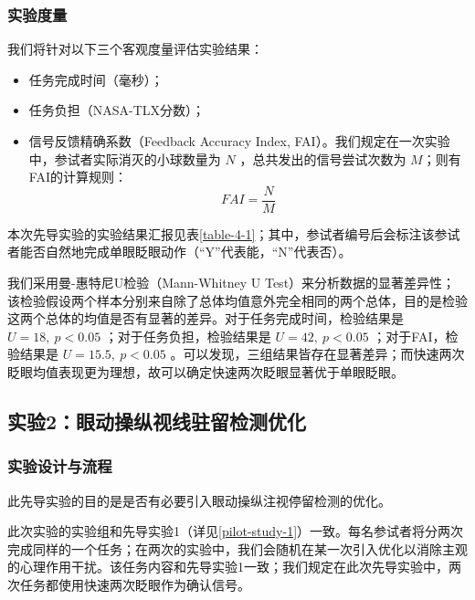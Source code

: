 \subsubsection{实验度量}

我们将针对以下三个客观度量评估实验结果：

\begin{itemize}[wide]
	\item 任务完成时间（毫秒）；
	\item 任务负担（NASA-TLX分数）；
	\item 信号反馈精确系数（Feedback Accuracy Index, FAI）。我们规定在一次实验中，参试者实际消灭的小球数量为 $N$ ，总共发出的信号尝试次数为 $M$；则有FAI的计算规则：
	\begin{equation}
	FAI = \frac{N}{M}
	\label{formula-4-1}
	\end{equation}
\end{itemize}

本次先导实验的实验结果汇报见表\ref{table-4-1}；其中，参试者编号后会标注该参试者能否自然地完成单眼眨眼动作（“Y”代表能，“N”代表否）。

我们采用曼-惠特尼U检验（Mann-Whitney U Test）来分析数据的显著差异性；该检验假设两个样本分别来自除了总体均值意外完全相同的两个总体，目的是检验这两个总体的均值是否有显著的差异。对于任务完成时间，检验结果是 $U = 18,\ p < 0.05$ ；对于任务负担，检验结果是 $U = 42,\ p < 0.05$ ；对于FAI，检验结果是 $U = 15.5,\ p < 0.05$ 。可以发现，三组结果皆存在显著差异；而快速两次眨眼均值表现更为理想，故可以确定快速两次眨眼显著优于单眼眨眼。

\subsection{实验2：眼动操纵视线驻留检测优化}

\subsubsection{实验设计与流程}

此先导实验的目的是是否有必要引入眼动操纵注视停留检测的优化。

此次实验的实验组和先导实验1（详见\ref{pilot-study-1}）一致。每名参试者将分两次完成同样的一个任务；在两次的实验中，我们会随机在某一次引入优化以消除主观的心理作用干扰。该任务内容和先导实验1一致；我们规定在此次先导实验中，两次任务都使用快速两次眨眼作为确认信号。


